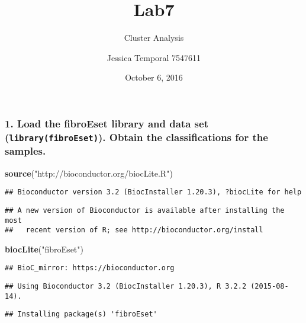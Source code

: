 \documentclass[]{article}
\title{Lab7}
\subtitle{Cluster Analysis}
\author{Jessica Temporal 7547611}
\date{October 6, 2016}
\newenvironment{Shaded}{\begin{snugshade}}{\end{snugshade}}
\newcommand{\KeywordTok}[1]{\textcolor[rgb]{0.13,0.29,0.53}{\textbf{{#1}}}}
\newcommand{\StringTok}[1]{\textcolor[rgb]{0.31,0.60,0.02}{{#1}}}
\newcommand{\NormalTok}[1]{{#1}}
\begin{document}
\maketitle

{
\setcounter{tocdepth}{4}
\tableofcontents
}
\newpage

\subsubsection{\texorpdfstring{1. Load the fibroEset library and data
set (\texttt{library(fibroEset)}). Obtain the classifications for the
samples.}{1. Load the fibroEset library and data set (library(fibroEset)). Obtain the classifications for the samples.}}\label{load-the-fibroeset-library-and-data-set-libraryfibroeset.-obtain-the-classifications-for-the-samples.}

\begin{Shaded}
\begin{Highlighting}[]
\KeywordTok{source}\NormalTok{(}\StringTok{"http://bioconductor.org/biocLite.R"}\NormalTok{)}
\end{Highlighting}
\end{Shaded}

\begin{verbatim}
## Bioconductor version 3.2 (BiocInstaller 1.20.3), ?biocLite for help
\end{verbatim}

\begin{verbatim}
## A new version of Bioconductor is available after installing the most
##   recent version of R; see http://bioconductor.org/install
\end{verbatim}

\begin{Shaded}
\begin{Highlighting}[]
\KeywordTok{biocLite}\NormalTok{(}\StringTok{"fibroEset"}\NormalTok{)}
\end{Highlighting}
\end{Shaded}

\begin{verbatim}
## BioC_mirror: https://bioconductor.org
\end{verbatim}

\begin{verbatim}
## Using Bioconductor 3.2 (BiocInstaller 1.20.3), R 3.2.2 (2015-08-14).
\end{verbatim}

\begin{verbatim}
## Installing package(s) 'fibroEset'
\end{verbatim}
\end{document}
